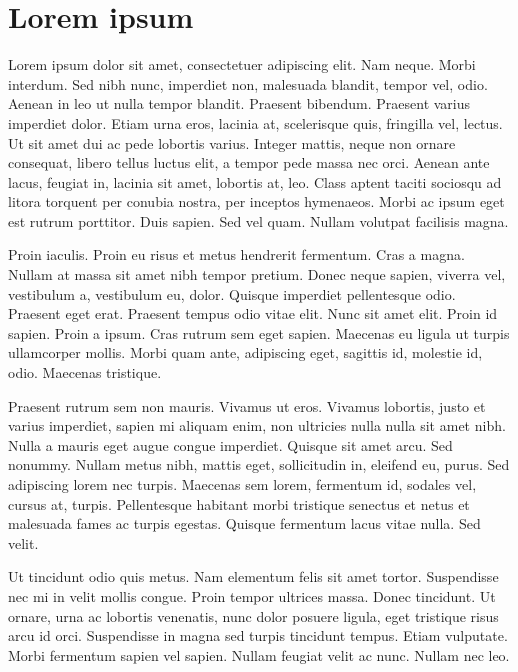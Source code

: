 


\chapter{Lorem ipsum}
Lorem ipsum dolor sit amet, consectetuer adipiscing elit. Nam
neque. Morbi interdum. Sed nibh nunc, imperdiet non, malesuada
blandit, tempor vel, odio. Aenean in leo ut nulla tempor
blandit. Praesent bibendum. Praesent varius imperdiet dolor. Etiam
urna eros, lacinia at, scelerisque quis, fringilla vel, lectus. Ut sit
amet dui ac pede lobortis varius. Integer mattis, neque non ornare
consequat, libero tellus luctus elit, a tempor pede massa nec
orci. Aenean ante lacus, feugiat in, lacinia sit amet, lobortis at,
leo. Class aptent taciti sociosqu ad litora torquent per conubia
nostra, per inceptos hymenaeos. Morbi ac ipsum eget est rutrum
porttitor. Duis sapien. Sed vel quam. Nullam volutpat facilisis magna.

Proin iaculis. Proin eu risus et metus hendrerit fermentum. Cras a
magna. Nullam at massa sit amet nibh tempor pretium. Donec neque
sapien, viverra vel, vestibulum a, vestibulum eu, dolor. Quisque
imperdiet pellentesque odio. Praesent eget erat. Praesent tempus odio
vitae elit. Nunc sit amet elit. Proin id sapien. Proin a ipsum. Cras
rutrum sem eget sapien. Maecenas eu ligula ut turpis ullamcorper
mollis. Morbi quam ante, adipiscing eget, sagittis id, molestie id,
odio. Maecenas tristique.

Praesent rutrum sem non mauris. Vivamus ut eros. Vivamus lobortis,
justo et varius imperdiet, sapien mi aliquam enim, non ultricies nulla
nulla sit amet nibh. Nulla a mauris eget augue congue
imperdiet. Quisque sit amet arcu. Sed nonummy. Nullam metus nibh,
mattis eget, sollicitudin in, eleifend eu, purus. Sed adipiscing lorem
nec turpis. Maecenas sem lorem, fermentum id, sodales vel, cursus at,
turpis. Pellentesque habitant morbi tristique senectus et netus et
malesuada fames ac turpis egestas. Quisque fermentum lacus vitae
nulla. Sed velit.

Ut tincidunt odio quis metus. Nam elementum felis sit amet
tortor. Suspendisse nec mi in velit mollis congue. Proin tempor
ultrices massa. Donec tincidunt. Ut ornare, urna ac lobortis
venenatis, nunc dolor posuere ligula, eget tristique risus arcu id
orci. Suspendisse in magna sed turpis tincidunt tempus. Etiam
vulputate. Morbi fermentum sapien vel sapien. Nullam feugiat velit ac
nunc. Nullam nec leo.

